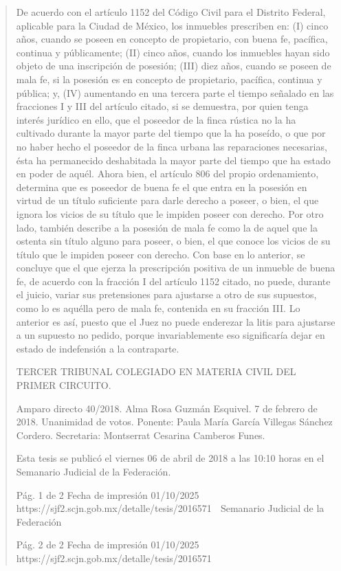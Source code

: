 \documentclass[11pt,a4paper]{article}
\begin{document}
\begin{quote}
De acuerdo con el artículo 1152 del Código Civil para el Distrito Federal, aplicable para la Ciudad de
México, los inmuebles prescriben en: (I) cinco años, cuando se poseen en concepto de propietario,
con buena fe, pacífica, continua y públicamente; (II) cinco años, cuando los inmuebles hayan sido
objeto de una inscripción de posesión; (III) diez años, cuando se poseen de mala fe, si la posesión
es en concepto de propietario, pacífica, continua y pública; y, (IV) aumentando en una tercera parte
el tiempo señalado en las fracciones I y III del artículo citado, si se demuestra, por quien tenga
interés jurídico en ello, que el poseedor de la finca rústica no la ha cultivado durante la mayor parte
del tiempo que la ha poseído, o que por no haber hecho el poseedor de la finca urbana las
reparaciones necesarias, ésta ha permanecido deshabitada la mayor parte del tiempo que ha
estado en poder de aquél. Ahora bien, el artículo 806 del propio ordenamiento, determina que es
poseedor de buena fe el que entra en la posesión en virtud de un título suficiente para darle derecho
a poseer, o bien, el que ignora los vicios de su título que le impiden poseer con derecho. Por otro
lado, también describe a la posesión de mala fe como la de aquel que la ostenta sin título alguno
para poseer, o bien, el que conoce los vicios de su título que le impiden poseer con derecho. Con
base en lo anterior, se concluye que el que ejerza la prescripción positiva de un inmueble de buena
fe, de acuerdo con la fracción I del artículo 1152 citado, no puede, durante el juicio, variar sus
pretensiones para ajustarse a otro de sus supuestos, como lo es aquélla pero de mala fe, contenida
en su fracción III. Lo anterior es así, puesto que el Juez no puede enderezar la litis para ajustarse a
un supuesto no pedido, porque invariablemente eso significaría dejar en estado de indefensión a la
contraparte.

TERCER TRIBUNAL COLEGIADO EN MATERIA CIVIL DEL PRIMER CIRCUITO.


Amparo directo 40/2018. Alma Rosa Guzmán Esquivel. 7 de febrero de 2018. Unanimidad de votos.
Ponente: Paula María García Villegas Sánchez Cordero. Secretaria: Montserrat Cesarina Camberos
Funes.


Esta tesis se publicó el viernes 06 de abril de 2018 a las 10:10 horas en el Semanario Judicial de la
Federación.


                                              Pág. 1 de 2             Fecha de impresión 01/10/2025
  https://sjf2.scjn.gob.mx/detalle/tesis/2016571
                                                 Semanario Judicial de la Federación




                                            Pág. 2 de 2       Fecha de impresión 01/10/2025
https://sjf2.scjn.gob.mx/detalle/tesis/2016571

\end{quote}
\end{document}
